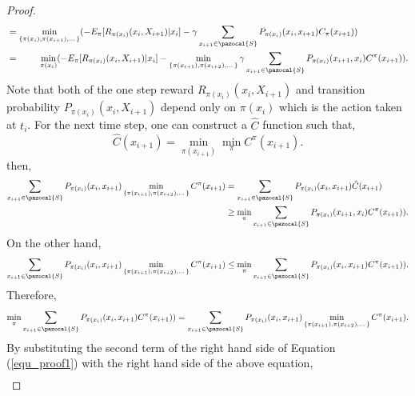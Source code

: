 \documentclass[11pt]{article}
\theoremstyle{definition}
\begin{document}
\begin{proof}
\begin{equation}
\begin{aligned}
& =  \min_{\{\pi(x_{i}), \pi(x_{{i+1}}),\dots \}}(- E_{\pi}[R_{\pi(x_i)}(x_{i}, X_{{i+1}}) | x_{i}] - \gamma \sum_{x_{i+1} \in \pazocal{S}} P_{\pi(x_{i})}(x_{i},x_{i+1}) C_{\pi}({x_{{i+1}}}))\\
& = ~~~~~~~ \min_{\pi(x_{i})} (- E_{\pi}[R_{\pi(x_i)}(x_{i}, X_{{i+1}}) | x_{i}] - \min_{\{\pi(x_{i+1}), \pi(x_{{i+2}}),\dots \}} \gamma \sum_{x_{i+1} \in \pazocal{S}} P_{\pi(x_{i})}(x_{i+1},x_{i}) C^{\pi}({x_{{i+1}}})).\\
\end{aligned}
\end{equation}
Note that both of the one step reward $R_{\pi(x_i)}(x_{i}, X_{{i+1}})$ and transition probability $P_{\pi(x_{i})}(x_{i}, X_{{i+1}})$ depend only on $\pi(x_{i})$ which is the action taken at $t_i$. 
For the next time step, one can construct a $\hat {C}$ function such that, 
\begin{equation*}
\hat C(x_{{i+1}}) = \min_{\pi(x_{{i+1}})} \min_{\pi} C^{\pi} ({x_{i+1}}).
\end{equation*}
then, 
\begin{equation*}
\begin{aligned}
\sum_{x_{i+1} \in \pazocal{S}} P_{\pi(x_{i})}(x_{i},x_{i+1}) \min_{\{\pi(x_{i+1}), \pi(x_{{i+2}}),\dots \}} C^{\pi}({x_{{i+1}}})&= \sum_{x_{i+1} \in \pazocal{S}} P_{\pi(x_{i})}(x_{i},x_{i+1})  \hat C ({x_{{i+1}}} )\\
& \geq \min_{\pi} \sum_{x_{i+1} \in \pazocal{S}} P_{\pi(x_{i})}(x_{i+1},x_{i}) C^{\pi}({x_{{i+1}}})).
\end{aligned}
\end{equation*}
On the other hand, 
\begin{equation*}
\sum_{x_{i+1} \in \pazocal{S}} P_{\pi(x_{i})}(x_{i},x_{i+1}) \min_{\{\pi(x_{i+1}), \pi(x_{{i+2}}),\dots \}} C^{\pi}({x_{{i+1}}}) \leq \min_{\pi} \sum_{x_{i+1} \in \pazocal{S}} P_{\pi(x_{i})}(x_{i},x_{i+1}) C^{\pi}({x_{{i+1}}})).
\end{equation*}
Therefore,
\begin{equation*}
 \min_{\pi} \sum_{x_{i+1} \in \pazocal{S}} P_{\pi(x_{i})}(x_{i},x_{i+1}) C^{\pi}({x_{{i+1}}}))=\sum_{x_{i+1} \in \pazocal{S}} P_{\pi(x_{i})}(x_{i},x_{i+1}) \min_{\{\pi(x_{i+1}), \pi(x_{{i+2}}),\dots \}} C^{\pi}({x_{{i+1}}}).
\end{equation*}
By substituting the second term of the right hand side of Equation (\ref{equ_proof1}) with the right hand side of the above equation,
\begin{equation*}
\begin{aligned}

\end{aligned}
\end{equation*}
\end{proof}
\end{document}
